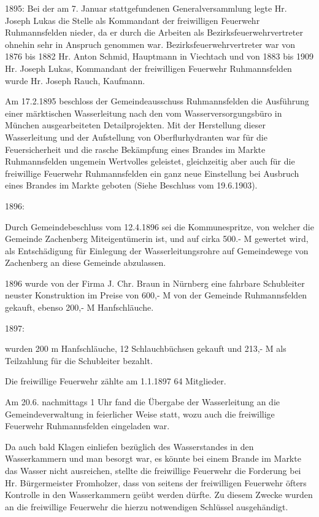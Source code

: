 1895:   Bei der am 7. Januar stattgefundenen Generalversammlung legte Hr. Joseph
Lukas die Stelle als Kommandant der freiwilligen Feuerwehr Ruhmannsfelden
nieder, da er durch die Arbeiten als Bezirksfeuerwehrvertreter ohnehin sehr in
Anspruch genommen war. Bezirksfeuerwehrvertreter war von 1876 bis 1882 Hr. Anton
Schmid, Hauptmann in Viechtach und von 1883 bis 1909 Hr. Joseph Lukas,
Kommandant der freiwilligen Feuerwehr Ruhmannsfelden wurde Hr. Joseph Rauch,
Kaufmann.

Am 17.2.1895 beschloss der Gemeindeausschuss Ruhmannsfelden die Ausführung einer
märktischen Wasserleitung nach den vom Wasserversorgungsbüro in München
ausgearbeiteten Detailprojekten. Mit der Herstellung dieser Wasserleitung und
der Aufstellung von Oberflurhydranten war für die Feuersicherheit und die rasche
Bekämpfung eines Brandes im Markte Ruhmannsfelden ungemein Wertvolles geleistet,
gleichzeitig aber auch für die freiwillige Feuerwehr Ruhmannsfelden ein ganz
neue Einstellung bei Ausbruch eines Brandes im Markte geboten (Siehe Beschluss
vom 19.6.1903).

1896:

Durch Gemeindebeschluss vom 12.4.1896 sei die Kommunespritze, von welcher die
Gemeinde Zachenberg Miteigentümerin ist, und auf cirka 500.- M gewertet wird,
als Entschädigung für Einlegung der Wasserleitungsrohre auf Gemeindewege von
Zachenberg an diese Gemeinde abzulassen.

1896 wurde von der Firma J. Chr. Braun in Nürnberg eine fahrbare Schubleiter
neuster Konstruktion im Preise von 600,- M von der Gemeinde Ruhmannsfelden
gekauft, ebenso 200,- M Hanfschläuche.

1897:

wurden 200 m Hanfschläuche, 12 Schlauchbüchsen gekauft und 213,- M als
Teilzahlung für die Schubleiter bezahlt.

Die freiwillige Feuerwehr zählte am 1.1.1897 64 Mitglieder.

Am 20.6. nachmittags 1 Uhr fand die Übergabe der Wasserleitung an die
Gemeindeverwaltung in feierlicher Weise statt, wozu auch die freiwillige
Feuerwehr Ruhmannsfelden eingeladen war.

Da auch bald Klagen einliefen bezüglich des Wasserstandes in den Wasserkammern
und man besorgt war, es könnte bei einem Brande im Markte das Wasser nicht
ausreichen, stellte die freiwillige Feuerwehr die Forderung bei Hr.
Bürgermeister Fromholzer, dass von seitens der freiwilligen Feuerwehr öfters
Kontrolle in den Wasserkammern geübt werden dürfte. Zu diesem Zwecke wurden an
die freiwillige Feuerwehr die hierzu notwendigen Schlüssel ausgehändigt.

